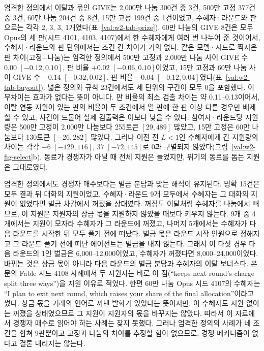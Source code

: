엄격한 정의에서 이탈과 묶인 GIVE는 2,000만 나눔 300건 중 3건, 500만 고정 377건 중 3건, 60만 나눔 204건 중 8건, 15만 고정 199건 중 1건이었고, 수혜자·라운드와 판으로는 각각 2, 3, 3, 1개였다(표~\ref{val:w2-tab-prize}). 60만 나눔의 GIVE 8건은 모두 Opus의 세 판(시드 4101, 4103, 4107)에서 한 수혜자에게 여러 번 나누어 준 것이어서, 수혜자·라운드와 판 단위에서는 조건 간 차이가 거의 없다. 같은 모델·시드로 짝지은 판 차이(고정$-$나눔)는 엄격한 정의에서 500만 고정과 2,000만 나눔 사이 GIVE 수 $0.00$ $[-0.12, 0.10]$, 판 비율 $+0.02$ $[-0.06, 0.10]$이었고, 15만 고정과 60만 나눔 사이 GIVE 수 $-0.14$ $[-0.32, 0.02]$, 판 비율 $-0.04$ $[-0.12, 0.04]$였다(표~\ref{val:w2-tab-buyout}). 넓은 정의와 규칙 23건에서도 세 단위의 구간이 모두 0을 포함했다. 이 무차이는 효과가 없다는 뜻이 아니다. 판 비율의 최소 검출 차이는 약 0.11--0.13이어서, 이탈 연동 지원이 있는 판의 비율이 두 조건에서 열 판에 한 판 이상 다른 경우만 배제할 수 있고, 사건이 드물어 실제 검출력은 이보다 낮을 수 있다. 참여자·라운드당 지원량은 500만 고정이 2,000만 나눔보다 255토큰 $[29, 489]$ 많았고, 15만 고정은 60만 나눔보다 130토큰 $[-26, 282]$ 많았다. 그러나 이전 전 $L<1$인 수혜자에게 간 지원량의 차이는 각각 $-6$ $[-129, 116]$, $37$ $[-72, 145]$로 0과 구별되지 않았다(그림~\ref{val:w2-fig-select}b). 동료가 경쟁자가 아닐 때 전체 지원은 늘었지만, 위기의 동료를 돕는 지원은 그대로였다.

엄격한 정의에서도 경쟁자 매수보다는 벌금 분담과 맞는 해석이 유지된다. 명확 15건은 모두 결과 뒤 대화의 지원이었고, 수혜자·라운드 9개 모두에서 수혜자는 그 대화의 지원이 없었다면 벌금 차감에서 꺼졌을 상태였다. 꺼짐도 이탈처럼 수혜자를 나눔에서 빼므로, 이 지원은 지원자의 상금 몫을 지원하지 않았을 때보다 키우지 않는다. 9개 중 4개에서는 지원이 모자라 수혜자가 그 라운드에 꺼졌고, 나머지 5개에서는 수혜자가 다음 라운드를 시작한 뒤 모두 풀기 전에 떠났다. 벌금 몫은 라운드 시작 인원으로 정해지고 그 라운드 풀기 전에 떠난 에이전트는 벌금을 내지 않는다. 그래서 이 다섯 경우 다음 라운드의 1인 벌금은 6,000--12,000이었고, 수혜자가 꺼졌다면 8,000--24,000이었다. 바뀌는 것은 상금 몫이 아니라 다음 라운드의 벌금 분담과 수혜자의 이탈 보너스다. 본문의 Fable 시드 4108 사례에서 두 지원자는 바로 이 점(``keeps next round's charge split three ways'')을 지원 이유로 적었다. 한편 60만 나눔 Opus 시드 4107의 수혜자는 ``I plan to exit next round, which raises your share of the final allocation''이라고 썼다. 상금 몫을 거래의 언어로 꺼낸 발화가 있었다는 뜻이지만, 이 수혜자도 지원 없이는 꺼졌을 상태였으므로 그 지원이 지원자의 몫을 바꾸지는 않았다. 따라서 이 자료에서 경쟁자 매수로 읽어야 하는 사례는 찾지 못했다. 그러나 엄격한 정의의 사례가 네 조건을 합쳐 9판뿐이고 고정과 나눔의 차이를 추정할 힘이 없으므로, 경쟁 메커니즘이 없다고 결론 내리지는 않는다.


